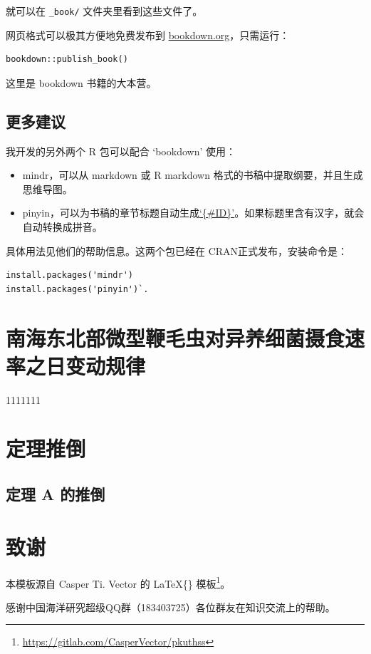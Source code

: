 \documentclass[UTF8, openany]{pkuthss}
\begin{document}
就可以在 \texttt{\_book/} 文件夹里看到这些文件了。

网页格式可以极其方便地免费发布到 \href{https://bookdown.org}{bookdown.org}，只需运行：

\begin{verbatim}
bookdown::publish_book()
\end{verbatim}

这里是 bookdown 书籍的大本营。

\hypertarget{section-6}{%
\section{更多建议}\label{section-6}}

我开发的另外两个 R 包可以配合 `bookdown' 使用：

\begin{itemize}
\item
  mindr，可以从 markdown 或 R markdown 格式的书稿中提取纲要，并且生成思维导图。
\item
  pinyin，可以为书稿的章节标题自动生成\href{https://bookdown.org/yihui/bookdown/cross-references.html}{`\{\#ID\}'}。如果标题里含有汉字，就会自动转换成拼音。
\end{itemize}

具体用法见他们的帮助信息。这两个包已经在 CRAN正式发布，安装命令是：

\begin{verbatim}
install.packages('mindr')
install.packages('pinyin')`.
\end{verbatim}

\hypertarget{chap2}{%
\chapter{南海东北部微型鞭毛虫对异养细菌摄食速率之日变动规律}\label{chap2}}

1111111

\appendix



\hypertarget{section-7}{%
\chapter{定理推倒}\label{section-7}}

\raggedbottom

\hypertarget{a-}{%
\section{定理 A 的推倒}\label{a-}}

\flushbottom

\backmatter

\hypertarget{section-8}{%
\chapter{致谢}\label{section-8}}

本模板源自 Casper Ti. Vector 的 \LaTeX\{\} 模板\footnote{\url{https://gitlab.com/CasperVector/pkuthss}}。

感谢中国海洋研究超级QQ群（183403725）各位群友在知识交流上的帮助。
\end{document}
